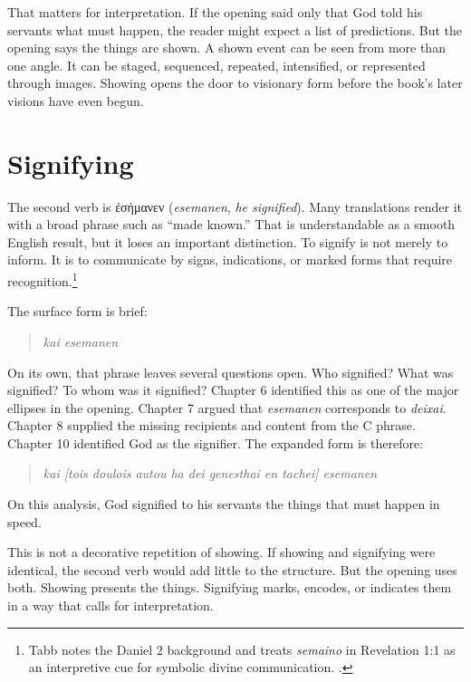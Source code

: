 That matters for interpretation. If the opening said only that God told his servants what must happen, the reader might expect a list of predictions. But the opening says the things are shown. A shown event can be seen from more than one angle. It can be staged, sequenced, repeated, intensified, or represented through images. Showing opens the door to visionary form before the book's later visions have even begun.

\section{Signifying}

The second verb is \textgreek{ἐσήμανεν} (\textit{esemanen}, \textit{he signified}). Many translations render it with a broad phrase such as ``made known.'' That is understandable as a smooth English result, but it loses an important distinction. To signify is not merely to inform. It is to communicate by signs, indications, or marked forms that require recognition.\footnote{Tabb notes the Daniel 2 background and treats \textit{semaino} in Revelation 1:1 as an interpretive cue for symbolic divine communication. \autocite{tabbTgcRevelation}.}

The surface form is brief:

\begin{quote}
\textit{kai esemanen}
\end{quote}

On its own, that phrase leaves several questions open. Who signified? What was signified? To whom was it signified? Chapter 6 identified this as one of the major ellipses in the opening. Chapter 7 argued that \textit{esemanen} corresponds to \textit{deixai}. Chapter 8 supplied the missing recipients and content from the C phrase. Chapter 10 identified God as the signifier. The expanded form is therefore:

\begin{quote}
\textit{kai [tois doulois autou ha dei genesthai en tachei] esemanen}
\end{quote}

On this analysis, God signified to his servants the things that must happen in speed.

This is not a decorative repetition of showing. If showing and signifying were identical, the second verb would add little to the structure. But the opening uses both. Showing presents the things. Signifying marks, encodes, or indicates them in a way that calls for interpretation.

